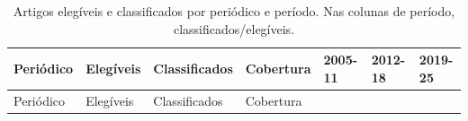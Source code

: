 \documentclass[
]{article}
\begin{document}
\begin{longtable}[]{@{}
  >{\raggedright\arraybackslash}p{}
  >{\raggedright\arraybackslash}p{}
  >{\raggedright\arraybackslash}p{}
  >{\raggedright\arraybackslash}p{}
  >{\raggedright\arraybackslash}p{}
  >{\raggedright\arraybackslash}p{}
  >{\raggedright\arraybackslash}p{}@{}}
\caption{Artigos elegíveis e classificados por periódico e período. Nas
colunas de período, classificados/elegíveis.}\tabularnewline
\toprule\noalign{}
\begin{minipage}[b]{\linewidth}\raggedright
Periódico
\end{minipage} & \begin{minipage}[b]{\linewidth}\raggedright
Elegíveis
\end{minipage} & \begin{minipage}[b]{\linewidth}\raggedright
Classificados
\end{minipage} & \begin{minipage}[b]{\linewidth}\raggedright
Cobertura
\end{minipage} & \begin{minipage}[b]{\linewidth}\raggedright
2005-11
\end{minipage} & \begin{minipage}[b]{\linewidth}\raggedright
2012-18
\end{minipage} & \begin{minipage}[b]{\linewidth}\raggedright
2019-25
\end{minipage} \\
\midrule\noalign{}
\endfirsthead
\toprule\noalign{}
\begin{minipage}[b]{\linewidth}\raggedright
Periódico
\end{minipage} & \begin{minipage}[b]{\linewidth}\raggedright
Elegíveis
\end{minipage} & \begin{minipage}[b]{\linewidth}\raggedright
Classificados
\end{minipage} & \begin{minipage}[b]{\linewidth}\raggedright
Cobertura
\end{minipage} & \begin{minipage}[b]{\linewidth}\raggedright

\end{minipage}
\end{longtable}
\end{document}
